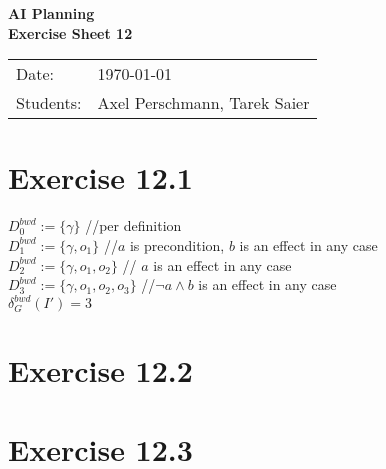 \documentclass[11pt,a4paper]{article}
\newcommand{\sheetNr}{12}
\begin{document}
\begin{center}
\Huge{\textbf{AI Planning}}\\
\LARGE{\textbf{Exercise Sheet \sheetNr}}
\end{center}
\vspace{2cm}
\begin{tabular}{ll}
Date: & \today\\
Students: & Axel Perschmann, Tarek Saier
\end{tabular}

\section*{Exercise 12.1}
$D^{bwd}_0:=\{\gamma\}$ \hphantom{tabtab} //per definition\\
$D^{bwd}_1:=\{\gamma,o_1\}$ \hphantom{tabtab} //$a$ is precondition, $b$ is an effect in any case\\
$D^{bwd}_2:=\{\gamma,o_1,o_2\}$ \hphantom{tabtab} // $a$ is an effect in any case\\
$D^{bwd}_3:=\{\gamma,o_1,o_2,o_3\}$ \hphantom{tabtab} //$\neg a\land b$ is an effect in any case\\
$\delta^{bwd}_G(I')=3$

\section*{Exercise 12.2}

\section*{Exercise 12.3}

\label{lastpage}
\end{document}
